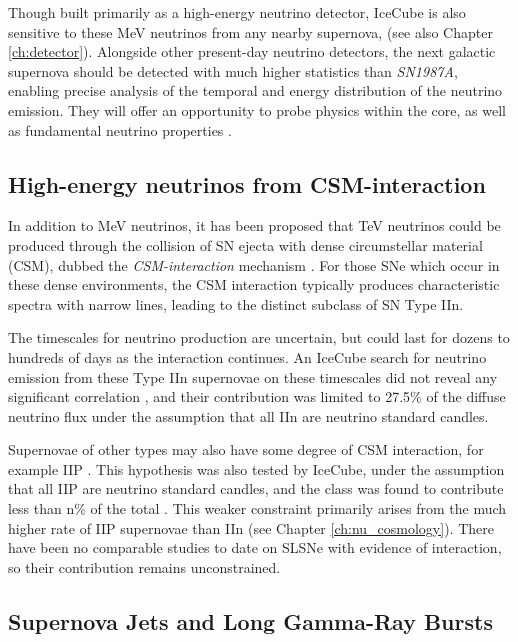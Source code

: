 Though built primarily as a high-energy neutrino detector, IceCube is also sensitive to these MeV neutrinos from any nearby supernova, (see also Chapter \ref{ch:detector}). Alongside other present-day neutrino detectors, the next galactic supernova should be detected with much higher statistics than \emph{SN1987A}, enabling precise analysis of the temporal and energy distribution of the neutrino emission. They will offer an opportunity to probe physics within the core, as well as fundamental neutrino properties \cite{sn_nu_review}.

\subsection*{High-energy neutrinos from CSM-interaction}

In addition to MeV neutrinos, it has been proposed that TeV neutrinos could be produced through the collision of SN ejecta with dense circumstellar material (CSM), dubbed the \emph{CSM-interaction} mechanism . For those SNe which occur in these dense environments, the CSM interaction typically produces characteristic spectra with narrow lines, leading to the distinct subclass of SN Type IIn. 

The timescales for neutrino production are uncertain, but could last for dozens to hundreds of days as the interaction continues. An IceCube search for neutrino emission from these Type IIn supernovae on these timescales did not reveal any significant correlation , and their contribution was limited to 27.5\%  of the diffuse neutrino flux under the assumption that all IIn are neutrino standard candles. 

Supernovae of other types may also have some degree of CSM interaction, for example IIP . This hypothesis was also tested by IceCube, under the assumption that all IIP are neutrino standard candles, and the class was found to contribute less than n\% of the total \cite{Stasik2018Search}. This weaker constraint primarily arises from the much higher rate of IIP supernovae than IIn (see Chapter \ref{ch:nu_cosmology}). There have been no comparable studies to date on SLSNe with evidence of interaction, so their contribution remains unconstrained.

\subsection*{Supernova Jets and Long Gamma-Ray Bursts}

